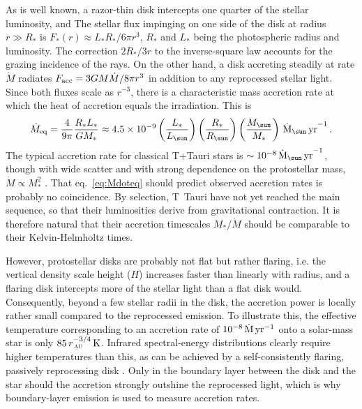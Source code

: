 \documentclass[12pt,preprint]{aastex}
\newcommand{\au}{\,\textsc{au}}
\begin{document}
As is well known, a razor-thin disk intercepts one quarter of the stellar luminosity, and
The stellar flux impinging on one side of the disk at radius $r\gg R_*$ is $F_*(r) \approx L_* R_*/6\pi r^3$,
$R_*$ and $L_*$  being the photospheric radius and luminosity.  The
correction $2R_*/3r$  to the inverse-square law accounts for the grazing incidence of the
rays.  On the other hand, a disk accreting steadily at rate $\dot M$ radiates $F_{\rm acc}
= 3GM\dot M/8\pi r^3$ in addition to any reprocessed stellar light.  Since both fluxes
scale as $r^{-3}$, there is a characteristic mass accretion rate at which the heat of
accretion equals the irradiation.  This is
\begin{equation}
  \label{eq:Mdoteq}
\dot M_{\rm eq} = \frac{4}{9\pi}\frac{R_* L_*}{GM_*} \approx 4.5\times 10^{-9} 
\left(\frac{L_*}{L_\sun}\right) \left(\frac{R_*}{R_\sun}\right)
\left(\frac{M_\sun}{M_*}\right) \,{\rm \dot M_\sun\,yr}^{-1}\,.
\end{equation}
The typical accretion rate for classical T+Tauri stars is $\sim 10^{-8}\,{\rm \dot
  M_\sun\,yr}^{-1}$, though with wide scatter and with strong dependence on the
protostellar mass, $\dot M\propto M_*^2$ \citep{Hartmann+Calvet+Gullbring+etal1998,
  Muzerolle+Luhman+Briceno2005,Fang+vanBoekel+Wang+etal2009}.  That eq.~\eqref{eq:Mdoteq}
should predict observed accretion rates is probably no coincidence.  By selection, T~Tauri
have not yet reached the main sequence, so that their luminosities derive from
gravitational contraction.  It is therefore natural that their accretion timescales
$M_*/\dot M$ should be comparable to their Kelvin-Helmholtz times.

However, protostellar disks are probably not flat but rather flaring, i.e. the vertical
density scale height ($H$) increases faster than linearly with radius, and a flaring disk
intercepts more of the stellar light than a flat disk would. Consequently, beyond a few
stellar radii in the disk, the accretion power is locally rather small compared to the
reprocessed emission.  To illustrate this, the effective temperature corresponding to an
accretion rate of $10^{-8}\,{\rm \dot M\,yr^{-1}}$ onto a solar-mass star is only
$85\,r_{\au}^{-3/4}\,{\rm K}$.  Infrared spectral-energy distributions clearly require
higher temperatures than this, as can be achieved by a self-consistently flaring,
passively reprocessing disk \citep{Chiang+Goldreich1997}.   Only in the boundary layer
between the disk and the star should the accretion strongly outshine
the reprocessed light, which is why boundary-layer emission is used to measure
accretion rates.
\end{document}
